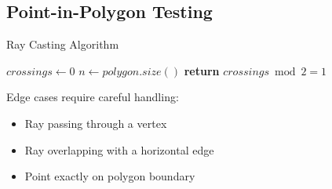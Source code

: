 
\subsection{Point-in-Polygon Testing}

\begin{algorithm}[H]
\caption{Ray Casting Algorithm}
$crossings \leftarrow 0$\;
$n \leftarrow polygon.size()$\;
\textbf{return} $crossings \bmod 2 = 1$\;
\end{algorithm}

\begin{warning}
Edge cases require careful handling:
\begin{itemize}
\item Ray passing through a vertex
\item Ray overlapping with a horizontal edge
\item Point exactly on polygon boundary
\end{itemize}
\end{warning} 